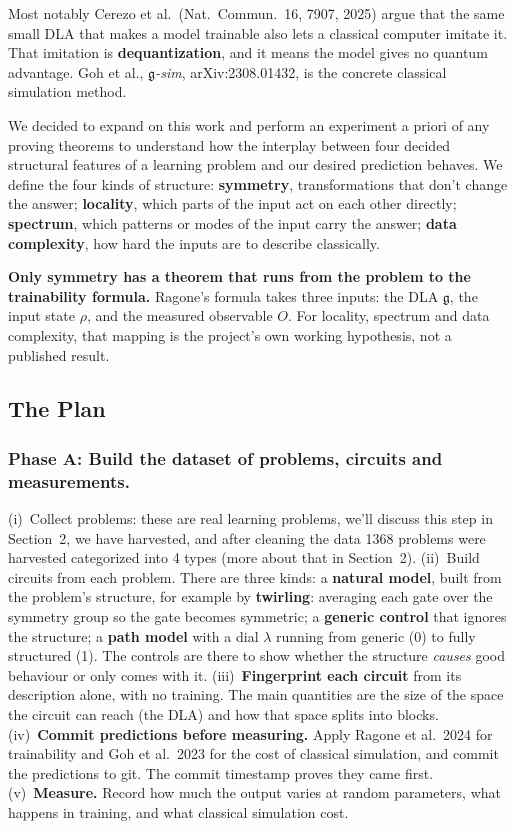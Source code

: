 \documentclass[10pt,a4paper]{article}
\begin{document}
Most notably Cerezo et al.\ (Nat.\ Commun.\ 16, 7907, 2025) argue that the same
small DLA that makes a model trainable also lets a classical computer imitate
it. That imitation is \textbf{dequantization}, and it means the model
gives no quantum advantage. Goh et al.,
\emph{$\mathfrak{g}$-sim}, arXiv:2308.01432, is the concrete
classical simulation method.

We decided to expand on this work and perform an experiment a priori of any
proving theorems to understand how the interplay between four decided
structural features of a learning problem and our desired prediction behaves.
We define the four kinds of structure:
\textbf{symmetry}, transformations that don't change the answer;
\textbf{locality}, which parts of the input act on each other directly;
\textbf{spectrum}, which patterns or modes of the input carry the answer;
\textbf{data complexity}, how hard the inputs are to describe classically.

\textbf{Only symmetry has a theorem that runs from the problem to the
trainability formula.} Ragone's formula takes three inputs: the DLA
$\mathfrak{g}$, the input state $\rho$, and the measured observable
$O$. For locality, spectrum and data complexity, that mapping is the project's
own working hypothesis, not a published result.

\subsection{The Plan}

\subsubsection*{Phase A: Build the dataset of problems, circuits and measurements.}

(i)~Collect problems: these are real learning problems, we'll discuss this
step in Section~2, we have harvested, and after cleaning the data 1368
problems were harvested categorized into 4 types (more about that in
Section~2).
(ii)~Build circuits from each problem. There are three kinds:
a \textbf{natural model}, built from the problem's structure,
for example by \textbf{twirling}: averaging each gate over the
symmetry group so the gate becomes symmetric;
a \textbf{generic control} that ignores the structure;
a \textbf{path model} with a dial $\lambda$ running from generic
(0) to fully structured (1).
The controls are there to show whether the structure \emph{causes} good
behaviour or only comes with it.
(iii)~\textbf{Fingerprint each circuit} from its description alone, with
no training. The main quantities are the size of the space the circuit can
reach (the DLA) and how that space splits into blocks.
(iv)~\textbf{Commit predictions before measuring.} Apply Ragone et al.\
2024 for trainability and Goh et al.\ 2023 for the cost of classical
simulation, and commit the predictions to git. The commit timestamp proves
they came first.
(v)~\textbf{Measure.} Record how much the output varies at random
parameters, what happens in training, and what classical simulation cost.
\end{document}
